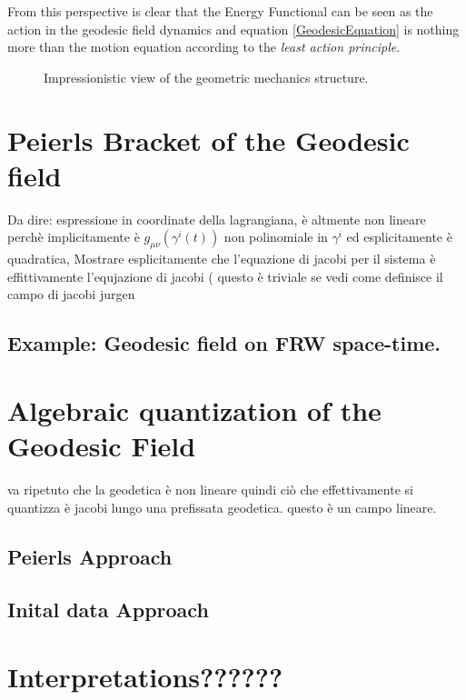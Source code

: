\documentclass[Main]{subfiles}
\begin{document}
	From this perspective is clear that the Energy Functional can be seen as the action in the geodesic field dynamics and equation \ref{GeodesicEquation} is nothing more than the motion equation according to the \emph{least action principle}.

		\begin{figure}[h!]
				  \centering
   	  \caption{Impressionistic view of the geometric mechanics structure.}
		\end{figure}		


\section{Peierls Bracket of the Geodesic field}

\danger

Da dire: espressione in coordinate della lagrangiana, è altmente non lineare perchè implicitamente è $g_{\mu\nu}(\gamma^i(t))$ non polinomiale in $\gamma^i$ ed esplicitamente è quadratica, Mostrare esplicitamente che l'equazione di jacobi per il sistema è effittivamente l'equjazione di jacobi ( questo è triviale se vedi come definisce il campo di jacobi jurgen 

\danger

	

\subsection{Example: Geodesic field on FRW space-time.}

\section{Algebraic quantization of the Geodesic Field}
	\danger
	
	va ripetuto che la geodetica è non lineare quindi ciò che effettivamente si quantizza è jacobi lungo una prefissata geodetica. questo è un campo lineare.
	
	\danger


\subsection{Peierls Approach}
\subsection{Inital data Approach}

\section{Interpretations??????}
\end{document}
